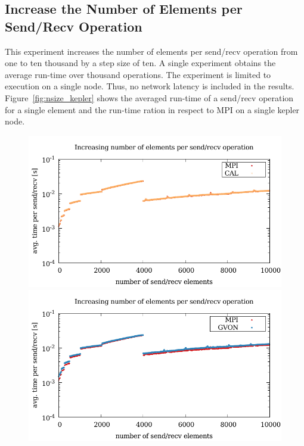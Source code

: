 \subsection*{Increase the Number of Elements per Send/Recv Operation}
This experiment increases the number of elements per send/recv
operation from one to ten thousand by a step size of ten. A single experiment
obtains the average run-time over thousand operations.  The experiment is
limited to execution on a single node. Thus, no network latency is
included in the results. Figure~\ref{fig:nsize_kepler} shows the
averaged run-time of a send/recv operation for a single element and
the run-time ration in respect to MPI on a single kepler node.

\begin{figure}[H]
  \begin{minipage}[t]{0.5\textwidth}
    \includegraphics[width=\textwidth]{plots/50_nsize_cal_laser}
    \includegraphics[width=\textwidth]{plots/50_nsize_gvon_laser}

\end{minipage}
\end{figure}
